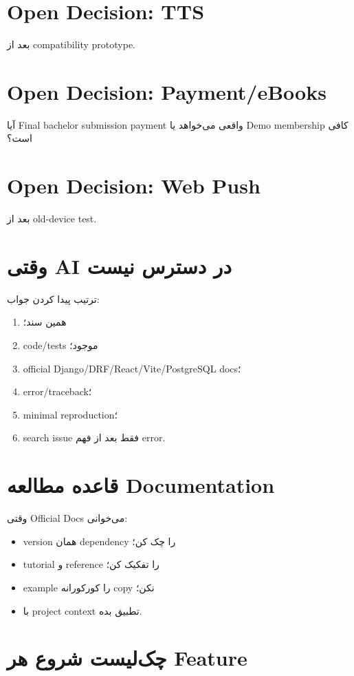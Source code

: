 \section{Open Decision: TTS}

بعد از compatibility prototype.

\section{Open Decision: Payment/eBooks}

آیا Final bachelor submission payment واقعی می‌خواهد یا Demo membership کافی است؟

\section{Open Decision: Web Push}

بعد از old-device test.

\section{وقتی AI در دسترس نیست}

ترتیب پیدا کردن جواب:
\begin{enumerate}
  \item همین سند؛
  \item code/tests موجود؛
  \item official Django/DRF/React/Vite/PostgreSQL docs؛
  \item error/traceback؛
  \item minimal reproduction؛
  \item search issue فقط بعد از فهم error.
\end{enumerate}

\section{قاعده مطالعه Documentation}

وقتی Official Docs می‌خوانی:
\begin{itemize}
  \item version همان dependency را چک کن؛
  \item tutorial و reference را تفکیک کن؛
  \item example را کورکورانه copy نکن؛
  \item با project context تطبیق بده.
\end{itemize}

\section{چک‌لیست شروع هر Feature}

